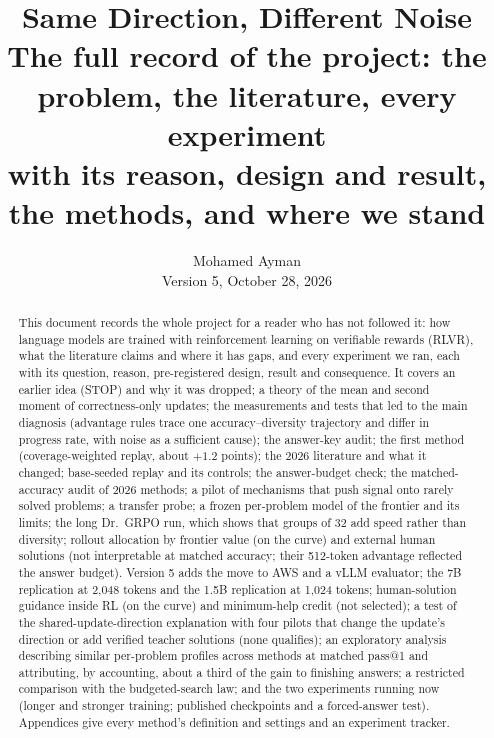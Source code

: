 \documentclass[11pt]{article}
\title{\textbf{Same Direction, Different Noise}\\[6pt]
\large The full record of the project: the problem, the literature, every experiment\\ with its reason, design and result, the methods, and where we stand}
\author{Mohamed Ayman\\\small Version 5, October 28, 2026}
\date{}
\begin{document}
\maketitle

\begin{abstract}
\noindent This document records the whole project for a reader who has not followed it: how language models are trained with reinforcement learning on verifiable rewards (RLVR), what the literature claims and where it has gaps, and every experiment we ran, each with its question, reason, pre-registered design, result and consequence. It covers an earlier idea (STOP) and why it was dropped; a theory of the mean and second moment of correctness-only updates; the measurements and tests that led to the main diagnosis (advantage rules trace one accuracy--diversity trajectory and differ in progress rate, with noise as a sufficient cause); the answer-key audit; the first method (coverage-weighted replay, about $+1.2$ points); the 2026 literature and what it changed; base-seeded replay and its controls; the answer-budget check; the matched-accuracy audit of 2026 methods; a pilot of mechanisms that push signal onto rarely solved problems; a transfer probe; a frozen per-problem model of the frontier and its limits; the long Dr.\ GRPO run, which shows that groups of 32 add speed rather than diversity; rollout allocation by frontier value (on the curve) and external human solutions (not interpretable at matched accuracy; their 512-token advantage reflected the answer budget). Version 5 adds the move to AWS and a vLLM evaluator; the 7B replication at 2,048 tokens and the 1.5B replication at 1,024 tokens; human-solution guidance inside RL (on the curve) and minimum-help credit (not selected); a test of the shared-update-direction explanation with four pilots that change the update's direction or add verified teacher solutions (none qualifies); an exploratory analysis describing similar per-problem profiles across methods at matched pass@1 and attributing, by accounting, about a third of the gain to finishing answers; a restricted comparison with the budgeted-search law; and the two experiments running now (longer and stronger training; published checkpoints and a forced-answer test). Appendices give every method's definition and settings and an experiment tracker.
\end{abstract}
\end{document}
